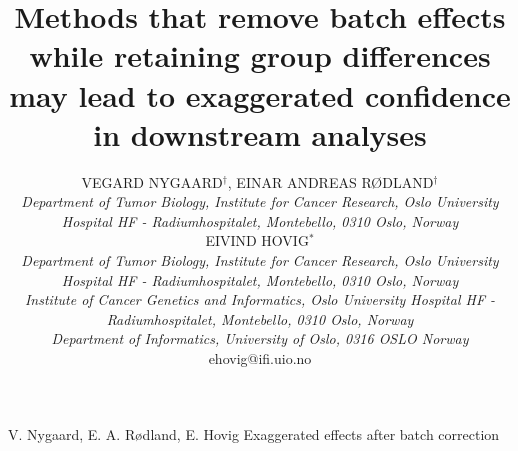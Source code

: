 \documentclass{bio}
\begin{document}
\renewcommand{\thefootnote}{§}

\title{Methods that remove batch effects while retaining group differences may lead
to exaggerated confidence in downstream analyses
}

\renewcommand{\thefootnote}{\textdagger}

\author{VEGARD NYGAARD$^\dagger$, EINAR ANDREAS RØDLAND$^\dagger$\\[4pt]
\textit{Department of Tumor Biology,
Institute for Cancer Research,
Oslo University Hospital HF - Radiumhospitalet,
Montebello,
0310 Oslo,
Norway}
\\[8pt]
EIVIND HOVIG$^\ast$\\[4pt]
\textit{Department of Tumor Biology,
Institute for Cancer Research,
Oslo University Hospital HF - Radiumhospitalet,
Montebello,
0310 Oslo,
Norway}
\\[2pt]
\textit{Institute of Cancer Genetics and Informatics, Oslo University Hospital HF - Radiumhospitalet,
Montebello, 
0310 Oslo,
Norway}
\\[2pt]
\textit{Department of Informatics, University of Oslo, 
0316 OSLO
Norway}
\\[2pt]
{ehovig@ifi.uio.no}}

\markboth%
{V. Nygaard, E. A. Rødland, E. Hovig}
{Exaggerated effects after batch correction}


\maketitle


\end{document}
